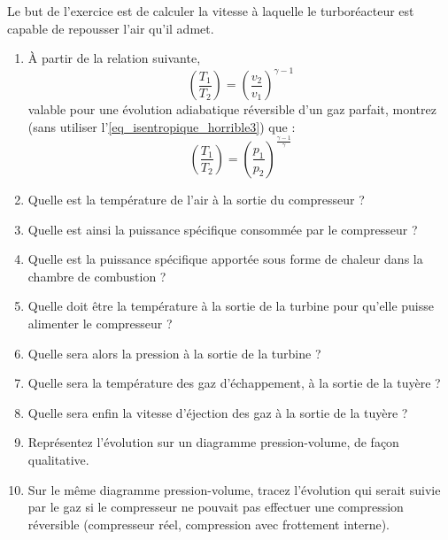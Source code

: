 	Le but de l’exercice est de calculer la vitesse à laquelle le turboréacteur est capable de repousser l’air qu’il admet.
	
	\pagebreak[1] %
	
	\begin{enumerate}
		\item À partir de la relation suivante,
			\begin{equation*}
				\left( \frac{T_1}{T_2} \right)	= \left( \frac{v_2}{v_1} \right)^{\gamma -1}
			\end{equation*}
			valable pour une évolution adiabatique réversible d’un gaz parfait, montrez (sans utiliser l’\cref{eq_isentropique_horrible3}) que :			
			\begin{equation*}
				\left( \frac{T_1}{T_2} \right)	=  \left( \frac{p_1}{p_2} \right)^{\frac{\gamma -1}{\gamma}}
			\end{equation*}
		\item Quelle est la température de l’air à la sortie du compresseur ?
		\item Quelle est ainsi la puissance spécifique consommée par le compresseur ?
		\item Quelle est la puissance spécifique apportée sous forme de chaleur dans la chambre de combustion ?
		\item Quelle doit être la température à la sortie de la turbine pour qu’elle puisse alimenter le compresseur ?
		\item Quelle sera alors la pression à la sortie de la turbine ?
		\item Quelle sera la température des gaz d’échappement, à la sortie de la tuyère ?
		\item Quelle sera enfin la vitesse d’éjection des gaz à la sortie de la tuyère ?
		\item Représentez l’évolution sur un diagramme pression-volume, de façon qualitative.
		\item Sur le même diagramme pression-volume, tracez l’évolution qui serait suivie par le gaz si le compresseur ne pouvait pas effectuer une compression réversible (compresseur réel, compression avec frottement interne).
	\end{enumerate}

